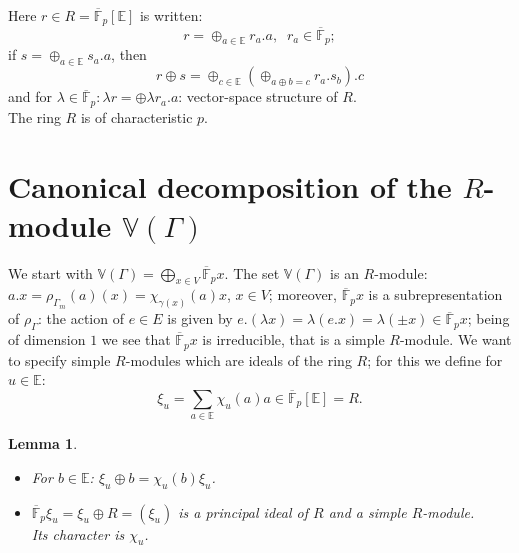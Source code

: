\documentclass[preprint,12pt,authoryear]{elsarticle}
\newtheorem{lem}[thm]{Lemma}
\theoremstyle{definition}
\begin{document}
Here ${\displaystyle r\in R= \overline{\mathbb{F}}_p[\mathbb{E}]}$ is written: 
$${\displaystyle r=\oplus_{a\in \mathbb{E}}r_a.a , \; \; r_a \in \overline{\mathbb{F}}_p};$$
if ${\displaystyle s = \oplus_{a\in \mathbb{E}}s_a.a}$, then 
$${\displaystyle r\oplus s=\oplus_{c \in \mathbb{E}}(\oplus_{a\oplus b=c} r_a.s_b).c}$$
and for ${\displaystyle \lambda \in \overline{\mathbb{F}}_p: \lambda r =\oplus \lambda r_a.a}$: vector-space structure of $R$. \\
The ring $R$ is of characteristic $p$. \\


\section{Canonical decomposition of the $R$-module $\mathbb{V}(\Gamma)$}\label{decomposition}

We start with $\mathbb{V}(\Gamma)= \bigoplus_{x \in V} \overline{\mathbb{F}}_p x$. The set $\mathbb{V}(\Gamma)$ is an  $R$-module: $a.x=\rho_{\Gamma_m}(a)(x)=\chi_{\gamma(x)}(a)x$, $x \in V$; moreover,  $\overline{\mathbb{F}}_p x$ is a subrepresentation of $\rho_{\Gamma}$: the action of $e \in E$ is given by $e.(\lambda x)=\lambda (e.x)=\lambda (\pm x) \in  \overline{\mathbb{F}}_px$; being of dimension $1$ we see that $ \overline{\mathbb{F}}_px$ is irreducible, that is a simple $R$-module. We want to specify simple $R$-modules which are ideals of the ring $R$; for this we define for $u\in \mathbb{E}$:
$$
\xi_u= \sum_{a \in \mathbb{E}}\chi_u(a)a \in  \overline{\mathbb{F}}_p[\mathbb{E}]=R.
$$




\begin{lem}\label{idealPrincipal} \mbox{}
\begin{itemize}
\item[i)] For $b \in \mathbb{E}$: $\xi_u \oplus b = \chi_u(b) \xi_u$.
\item[ii)] $ \overline{\mathbb{F}}_p \xi_u= \xi_u \oplus R= (\xi_u)$ is a principal ideal of $R$ and a simple $R$-module.\\
Its character is $\chi_u$.
\end{itemize}
\end{lem}
\end{document}
